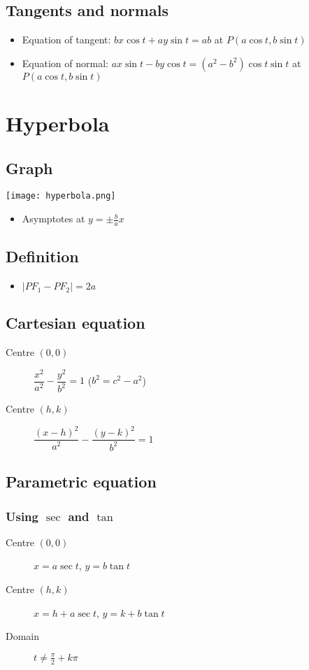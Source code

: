 \subsection{Tangents and normals}
\begin{itemize}
    \item Equation of tangent: $bx\cos t + ay\sin t = ab$ at $P(a\cos t, b\sin t)$
    \item Equation of normal: $ax\sin t - by\cos t=(a^2-b^2)\cos t\sin t$ at $P(a\cos t, b\sin t)$
\end{itemize}

\section{Hyperbola}
\subsection{Graph}
\texttt{[image: hyperbola.png]}
\begin{itemize}
    \item Asymptotes at $y=\pm \frac{b}{a}x$
\end{itemize}
\subsection{Definition}
\begin{itemize}
    \item $|PF_1 - PF_2| = 2a$
\end{itemize}
\subsection{Cartesian equation}
\begin{description}
    \item[Centre $(0,0)$] $\dfrac{x^2}{a^2}-\dfrac{y^2}{b^2}=1$ ($b^2=c^2-a^2$)
    \item[Centre $(h,k)$] $\dfrac{(x-h)^2}{a^2}-\dfrac{(y-k)^2}{b^2}=1$
\end{description}
\subsection{Parametric equation}
\subsubsection{Using $\sec$ and $\tan$}
\begin{description}
    \item[Centre $(0,0)$] $x=a\sec t$, $y=b\tan t$
    \item[Centre $(h,k)$] $x=h+a\sec t$, $y=k+b\tan t$
    \item[Domain] $t\neq \frac{\pi}{2}+k\pi$
\end{description}
